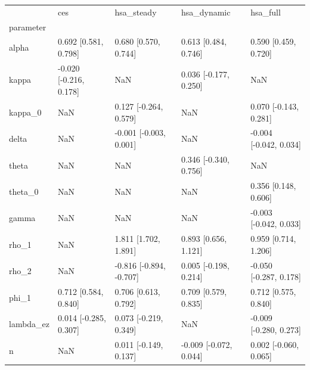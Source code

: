 \begin{tabular}{lllll}
\toprule
 & ces & hsa\_steady & hsa\_dynamic & hsa\_full \\
parameter &  &  &  &  \\
\midrule
alpha & 0.692 [0.581, 0.798] & 0.680 [0.570, 0.744] & 0.613 [0.484, 0.746] & 0.590 [0.459, 0.720] \\
kappa & -0.020 [-0.216, 0.178] & NaN & 0.036 [-0.177, 0.250] & NaN \\
kappa\_0 & NaN & 0.127 [-0.264, 0.579] & NaN & 0.070 [-0.143, 0.281] \\
delta & NaN & -0.001 [-0.003, 0.001] & NaN & -0.004 [-0.042, 0.034] \\
theta & NaN & NaN & 0.346 [-0.340, 0.756] & NaN \\
theta\_0 & NaN & NaN & NaN & 0.356 [0.148, 0.606] \\
gamma & NaN & NaN & NaN & -0.003 [-0.042, 0.033] \\
rho\_1 & NaN & 1.811 [1.702, 1.891] & 0.893 [0.656, 1.121] & 0.959 [0.714, 1.206] \\
rho\_2 & NaN & -0.816 [-0.894, -0.707] & 0.005 [-0.198, 0.214] & -0.050 [-0.287, 0.178] \\
phi\_1 & 0.712 [0.584, 0.840] & 0.706 [0.613, 0.792] & 0.709 [0.579, 0.835] & 0.712 [0.575, 0.840] \\
lambda\_ez & 0.014 [-0.285, 0.307] & 0.073 [-0.219, 0.349] & NaN & -0.009 [-0.280, 0.273] \\
n & NaN & 0.011 [-0.149, 0.137] & -0.009 [-0.072, 0.044] & 0.002 [-0.060, 0.065] \\
\bottomrule
\end{tabular}
